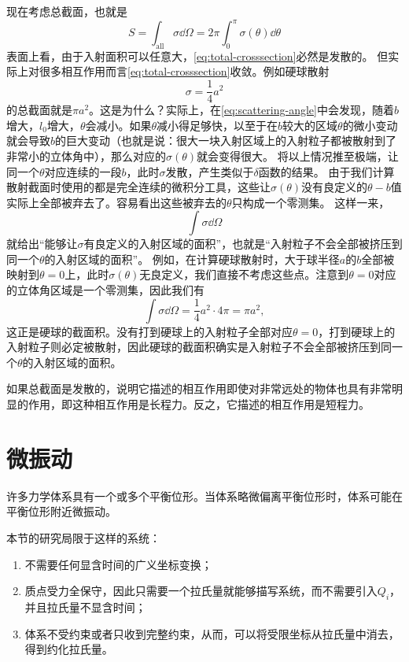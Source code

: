 现在考虑总截面，也就是
\begin{equation}
    S = \int_{\text{all}} \sigma \dd \Omega = 2\pi \int_0^{\pi} \sigma(\theta) \dd \theta
    \label{eq:total-crosssection}
\end{equation}
表面上看，由于入射面积可以任意大，\eqref{eq:total-crosssection}必然是发散的。
但实际上对很多相互作用而言\eqref{eq:total-crosssection}收敛。例如硬球散射
\[
    \sigma = \frac{1}{4} a^2
\]
的总截面就是$\pi a^2$。这是为什么？实际上，在\eqref{eq:scattering-angle}中会发现，随着$b$增大，$l_0$增大，$\theta$会减小。如果$\theta$减小得足够快，以至于在$b$较大的区域$\theta$的微小变动就会导致$b$的巨大变动（也就是说：很大一块入射区域上的入射粒子都被散射到了非常小的立体角中），那么对应的$\sigma(\theta)$就会变得很大。
将以上情况推至极端，让同一个$\theta$对应连续的一段$b$，此时$\sigma$发散，产生类似于$\delta$函数的结果。
由于我们计算散射截面时使用的都是完全连续的微积分工具，这些让$\sigma(\theta)$没有良定义的$\theta - b$值实际上全部被弃去了。容易看出这些被弃去的$\theta$只构成一个零测集。
这样一来，
\[
    \int \sigma \dd {\Omega}
\]
就给出“能够让$\sigma$有良定义的入射区域的面积”，也就是“入射粒子不会全部被挤压到同一个$\theta$的入射区域的面积”。
例如，在计算硬球散射时，大于球半径$a$的$b$全部被映射到$\theta=0$上，此时$\sigma(\theta)$无良定义，我们直接不考虑这些点。注意到$\theta=0$对应的立体角区域是一个零测集，因此我们有
\[
    \int \sigma \dd{\Omega} = \frac{1}{4} a^2 \cdot 4\pi = \pi a^2,
\]
这正是硬球的截面积。没有打到硬球上的入射粒子全部对应$\theta=0$，打到硬球上的入射粒子则必定被散射，因此硬球的截面积确实是入射粒子不会全部被挤压到同一个$\theta$的入射区域的面积。

如果总截面是发散的，说明它描述的相互作用即使对非常远处的物体也具有非常明显的作用，即这种相互作用是长程力。反之，它描述的相互作用是短程力。

\chapter{微振动}

许多力学体系具有一个或多个平衡位形。当体系略微偏离平衡位形时，体系可能在平衡位形附近微振动。

本节的研究局限于这样的系统：
\begin{enumerate}
    \item 不需要任何显含时间的广义坐标变换；
    \item 质点受力全保守，因此只需要一个拉氏量就能够描写系统，而不需要引入$Q_i$，并且拉氏量不显含时间；
    \item 体系不受约束或者只收到完整约束，从而，可以将受限坐标从拉氏量中消去，得到约化拉氏量。
\end{enumerate}

